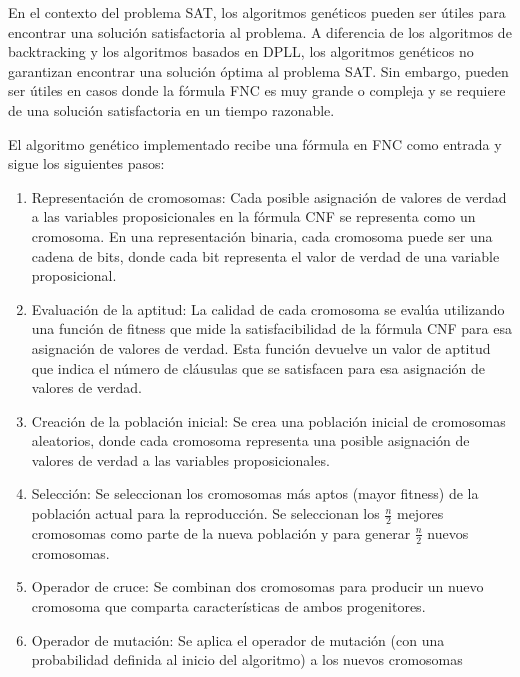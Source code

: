 \documentclass{article}
\begin{document}
        En el contexto del problema SAT, los algoritmos genéticos pueden ser útiles para encontrar
        una solución satisfactoria al problema. A diferencia de los algoritmos de backtracking y los algoritmos
        basados en DPLL, los algoritmos genéticos no garantizan encontrar una solución óptima 
        al problema SAT. Sin embargo, pueden ser útiles en casos donde la fórmula FNC es muy grande o compleja
        y se requiere de una solución satisfactoria en un tiempo razonable.

        El algoritmo genético implementado recibe una fórmula en FNC como entrada y sigue los siguientes pasos:

        \begin{enumerate}
            \item Representación de cromosomas:  Cada posible asignación de valores de verdad a las 
            variables proposicionales en la fórmula CNF se representa como un cromosoma. 
            En una representación binaria, cada cromosoma puede ser una cadena de bits, donde cada bit 
            representa el valor de verdad de una variable proposicional.
            \item Evaluación de la aptitud: La calidad de cada cromosoma se evalúa utilizando una 
            función de fitness que mide la satisfacibilidad de la fórmula CNF para esa 
            asignación de valores de verdad. Esta función devuelve un valor de aptitud que 
            indica el número de cláusulas que se satisfacen para esa asignación de valores de verdad.
            \item Creación de la población inicial: Se crea una población inicial de cromosomas aleatorios, 
            donde cada cromosoma representa una posible asignación de valores de verdad a 
            las variables proposicionales.
            \item Selección: Se seleccionan los cromosomas más aptos (mayor fitness) de la población actual para la 
            reproducción. Se seleccionan los $\frac{n}{2}$ mejores cromosomas como parte de la nueva población y 
            para generar $\frac{n}{2}$ nuevos cromosomas. 
            \item Operador de cruce: Se combinan dos cromosomas para producir 
            un nuevo cromosoma que comparta características de ambos progenitores.
            \item Operador de mutación: Se aplica el operador de mutación (con una probabilidad definida al inicio del algoritmo) 
            a los nuevos cromosomas 

\end{enumerate}
\end{document}
